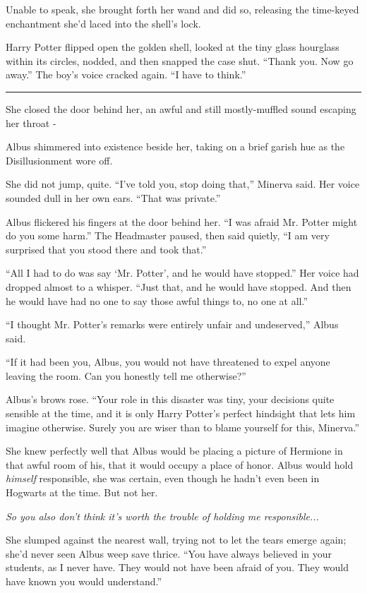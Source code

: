 Unable to speak, she brought forth her wand and did so, releasing the time-keyed enchantment she'd laced into the shell's lock.

Harry Potter flipped open the golden shell, looked at the tiny glass hourglass within its circles, nodded, and then snapped the case shut. ``Thank you. Now go away.'' The boy's voice cracked again. ``I have to think.''

\begin{center}\rule{3in}{0.4pt}\end{center}

She closed the door behind her, an awful and still mostly-muffled sound escaping her throat -

Albus shimmered into existence beside her, taking on a brief garish hue as the Disillusionment wore off.

She did not jump, quite. ``I've told you, stop doing that,'' Minerva said. Her voice sounded dull in her own ears. ``That was private.''

Albus flickered his fingers at the door behind her. ``I was afraid Mr. Potter might do you some harm.'' The Headmaster paused, then said quietly, ``I am very surprised that you stood there and took that.''

``All I had to do was say `Mr. Potter', and he would have stopped.'' Her voice had dropped almost to a whisper. ``Just that, and he would have stopped. And then he would have had no one to say those awful things to, no one at all.''

``I thought Mr. Potter's remarks were entirely unfair and undeserved,'' Albus said.

``If it had been you, Albus, you would not have threatened to expel anyone leaving the room. Can you honestly tell me otherwise?''

Albus's brows rose. ``Your role in this disaster was tiny, your decisions quite sensible at the time, and it is only Harry Potter's perfect hindsight that lets him imagine otherwise. Surely you are wiser than to blame yourself for this, Minerva.''

She knew perfectly well that Albus would be placing a picture of Hermione in that awful room of his, that it would occupy a place of honor. Albus would hold \emph{himself} responsible, she was certain, even though he hadn't even been in Hogwarts at the time. But not her.

\emph{So you also don't think it's worth the trouble of holding me responsible...}

She slumped against the nearest wall, trying not to let the tears emerge again; she'd never seen Albus weep save thrice. ``You have always believed in your students, as I never have. They would not have been afraid of you. They would have known you would understand.''

